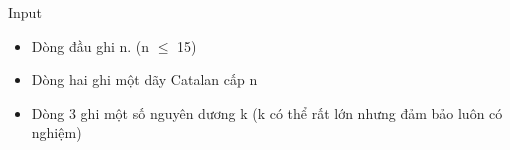 Input
\begin{itemize}
	\item Dòng đầu ghi n. (n  $\le$  15)
	\item Dòng hai ghi một dãy Catalan cấp n
	\item Dòng 3 ghi một số nguyên dương k (k có thể rất lớn nhưng đảm bảo luôn có nghiệm)
\end{itemize}

 